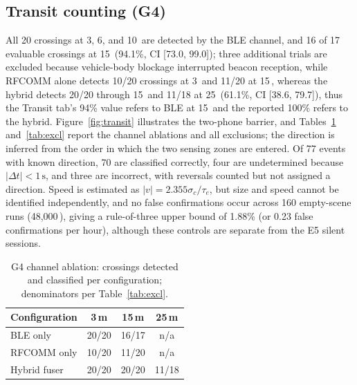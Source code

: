 \documentclass[conference,10pt]{IEEEtran}
\begin{document}
\subsection{Transit counting (G4)}
All 20 crossings at 3, 6, and 10\, are detected by the BLE channel, and 16 of 17 evaluable crossings at 15\, (94.1\%, CI [73.0, 99.0]); three additional trials are excluded because vehicle-body blockage interrupted beacon reception, while RFCOMM alone detects 10/20 crossings at 3\, and 11/20 at 15\,, whereas the hybrid detects 20/20 through 15\, and 11/18 at 25\, (61.1\%, CI [38.6, 79.7]), thus the Transit tab's 94\% value refers to BLE at 15\, and the reported 100\% refers to the hybrid. Figure~\ref{fig:transit} illustrates the two-phone barrier, and Tables~\ref{tab:ablation} and~\ref{tab:excl} report the channel ablations and all exclusions; the direction is inferred from the order in which the two sensing zones are entered. Of 77 events with known direction, 70 are classified correctly, four are undetermined because $|\Delta t| < 1\,\text{s}$, and three are incorrect, with reversals counted but not assigned a direction. Speed is estimated as $|v| = 2.355\sigma_c / \tau_e$, but size and speed cannot be identified independently, and no false confirmations occur across 160 empty-scene runs (48{,}000\,), giving a rule-of-three upper bound of 1.88\% (or 0.23 false confirmations per hour), although these controls are separate from the E5 silent sessions.

\begin{table}[t]
\centering
\caption{G4 channel ablation: crossings detected and classified per
configuration; denominators per Table~\ref{tab:excl}.}
\label{tab:ablation}
\footnotesize
\begin{tabular}{@{}lccc@{}}
\toprule
\textbf{Configuration} & \textbf{3\,m} & \textbf{15\,m} & \textbf{25\,m} \\
\midrule
BLE only      & 20/20 & 16/17 & n/a \\
RFCOMM only   & 10/20 & 11/20 & n/a \\
Hybrid fuser  & 20/20 & 20/20 & 11/18 \\
\bottomrule
\end{tabular}
\end{table}
\end{document}
